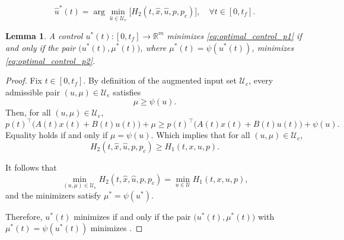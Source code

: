 \documentclass[10pt,a4paper]{amsart}
\newtheorem{lemma}{Lemma}
\newcommand{\SU}{{\mathcal U}}
\begin{document}
\begin{equation}\label{eq:optimal_control_p2}
    \hat u^*(t) = \arg \min_{\hat u \in \SU_e} \big[ H_2(t,\hat x,\hat u,p, p_c) \big], \quad \forall t \in [0,t_f].
\end{equation}

\begin{lemma}\rm\label{lemma:MICP2mayer}
A control $u^*(t):[0,t_f]\to\mathbb{R}^m$ minimizes \cref{eq:optimal_control_p1} if and only if the pair $\big(u^*(t),\mu^*(t)\big)$, where $\mu^*(t)=\psi(u^*(t))$, minimizes \cref{eq:optimal_control_p2}. 
\end{lemma}

\begin{proof}
    Fix $t\in[0,t_f]$. By definition of the augmented input set $\mathcal{U}_e$, every admissible pair $(u,\mu)\in\mathcal{U}_e$ satisfies
    \begin{equation*}
    \mu \ge \psi(u).
    \end{equation*}
    Then, for all $(u,\mu) \in \SU_e$,
    \begin{equation*}
    p(t)^\top\big(A(t)x(t)+B(t)u(t)\big) + \mu \geq p(t)^\top\big(A(t)x(t)+B(t)u(t)\big) + \psi(u).
    \end{equation*}
    Equality holds if and only if $\mu=\psi(u)$. Which implies that for all $(u,\mu) \in \SU_e$,
    \begin{equation*}
    H_2(t,\hat x,\hat u,p, p_c) \geq H_1(t,x,u,p).
    \end{equation*}
    
    It follows that
    \begin{equation*}
    \min_{(u,\mu)\in\mathcal{U}_e} H_2(t,\hat x,\hat u,p,p_c)
    =
    \min_{u\in\mathcal{U}} H_1(t,x,u,p),
    \end{equation*}
    and the minimizers satisfy $\mu^*=\psi(u^*)$.
    
    Therefore, $u^*(t)$ minimizes  if and only if the pair $\big(u^*(t),\mu^*(t)\big)$ with $\mu^*(t)=\psi(u^*(t))$ minimizes .
\end{proof}
\end{document}
